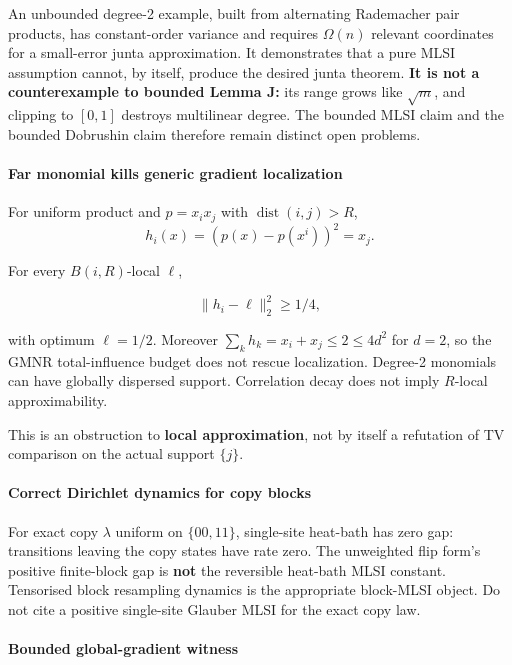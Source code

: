 An unbounded degree-2 example, built from alternating Rademacher pair products, has constant-order variance and requires \(\Omega(n)\) relevant coordinates for a small-error junta approximation. It demonstrates that a pure MLSI assumption cannot, by itself, produce the desired junta theorem. \textbf{It is not a counterexample to bounded Lemma J:} its range grows like \(\sqrt m\), and clipping to \([0,1]\) destroys multilinear degree. The bounded MLSI claim and the bounded Dobrushin claim therefore remain distinct open problems.

\paragraph{Far monomial kills generic gradient localization}\label{far-monomial-kills-generic-gradient-localization}

For uniform product and \(p=x_ix_j\) with \(\operatorname{dist}(i,j)>R\),
\[h_i(x)=(p(x)-p(x^i))^2=x_j.\]

For every \(B(i,R)\)-local \(\ell\),

\[\|h_i-\ell\|_2^2\ge1/4,\]

with optimum \(\ell=1/2\). Moreover \(\sum_kh_k=x_i+x_j\le2\le4d^2\) for \(d=2\), so the GMNR total-influence budget does not rescue localization. Degree-2 monomials can have globally dispersed support. Correlation decay does not imply \(R\)-local approximability.

This is an obstruction to \textbf{local approximation}, not by itself a refutation of TV comparison on the actual support \(\{j\}\).

\paragraph{Correct Dirichlet dynamics for copy blocks}\label{correct-dirichlet-dynamics-for-copy-blocks}

For exact copy \(\lambda\) uniform on \(\{00,11\}\), single-site heat-bath has zero gap: transitions leaving the copy states have rate zero. The unweighted flip form's positive finite-block gap is \textbf{not} the reversible heat-bath MLSI constant. Tensorised block resampling dynamics is the appropriate block-MLSI object. Do not cite a positive single-site Glauber MLSI for the exact copy law.

\paragraph{Bounded global-gradient witness}\label{bounded-global-gradient-witness}

